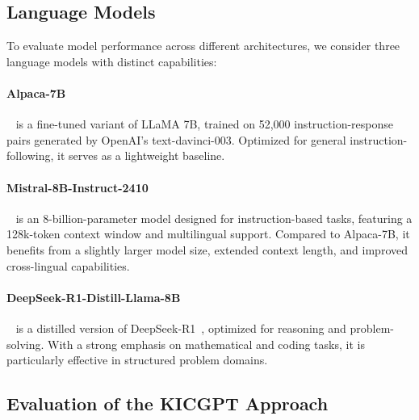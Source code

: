 \documentclass[12pt,a4paper]{article}
\begin{document}
\subsection{Language Models}

To evaluate model performance across different architectures, we consider three language models with distinct capabilities:

\paragraph{Alpaca-7B}~\cite{taori2023stanford} is a fine-tuned variant of LLaMA 7B, trained on 52,000 instruction-response pairs generated by OpenAI’s text-davinci-003.
Optimized for general instruction-following, it serves as a lightweight baseline.

\paragraph{Mistral-8B-Instruct-2410}~\cite{mistralai2024ministral8b} is an 8-billion-parameter model designed for instruction-based tasks, featuring a 128k-token context window and multilingual support.
Compared to Alpaca-7B, it benefits from a slightly larger model size, extended context length, and improved cross-lingual capabilities.

\paragraph{DeepSeek-R1-Distill-Llama-8B}~\cite{deepseekai2025deepseekr1distillllama8b} is a distilled version of DeepSeek-R1~\cite{guo2025deepseek}, optimized for reasoning and problem-solving.
With a strong emphasis on mathematical and coding tasks, it is particularly effective in structured problem domains.


\subsection{Evaluation of the KICGPT Approach}
\end{document}
